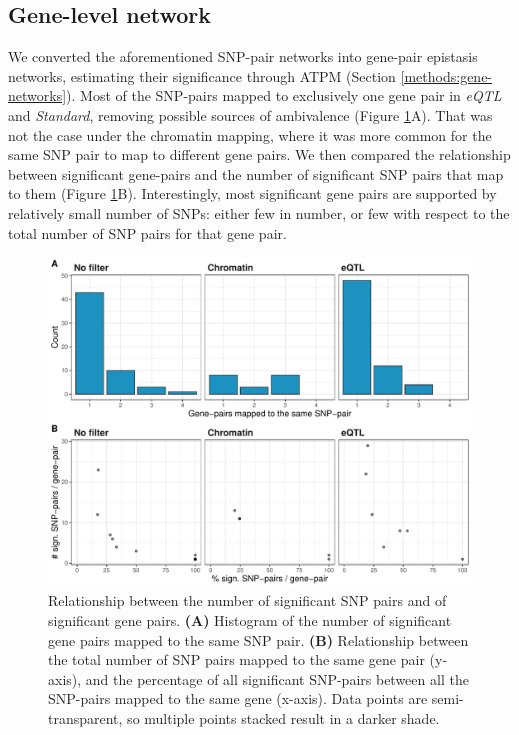 \documentclass[
  11pt,
]{env/yjiao}
\begin{document}
\hypertarget{results:gene-networks}{%
\subsection{Gene-level network}\label{results:gene-networks}}

We converted the aforementioned SNP-pair networks into gene-pair epistasis
networks, estimating their significance through ATPM (Section
\ref{methods:gene-networks}). Most of the SNP-pairs mapped to exclusively one
gene pair in \emph{eQTL} and \emph{Standard}, removing possible sources of ambivalence
(Figure \ref{fig:sign-snps-per-gene-and-viceversa}A). That was
not the case under the chromatin mapping, where it was more common for the same
SNP pair to map to different gene pairs. We then compared the relationship
between significant gene-pairs and the number of significant SNP pairs that map
to them (Figure \ref{fig:sign-snps-per-gene-and-viceversa}B).
Interestingly, most significant gene pairs are supported by
relatively small number of SNPs: either few in number, or few with respect to
the total number of SNP pairs for that gene pair.



\begin{figure}
\centering
\includegraphics{fig/sign_snps_per_gene_and_viceversa.pdf}
\caption{\label{fig:sign-snps-per-gene-and-viceversa}Relationship between the number of significant SNP pairs and of significant gene pairs. \textbf{(A)} Histogram of the number of significant gene pairs mapped to the same SNP pair. \textbf{(B)} Relationship between the total number of SNP pairs mapped to the same gene pair (y-axis), and the percentage of all significant SNP-pairs between all the SNP-pairs mapped to the same gene (x-axis). Data points are semi-transparent, so multiple points stacked result in a darker shade.}
\end{figure}
\end{document}
